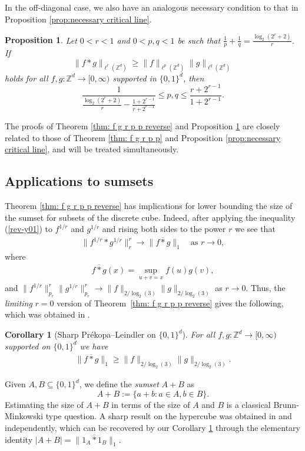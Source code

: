 \documentclass[reqno, 10pt]{amsart}
\theoremstyle{plain}
\numberwithin{equation}{section}
\newtheorem{corollary}[theorem]{Corollary}
\newtheorem{proposition}[theorem]{Proposition}
\theoremstyle{definition}
\newtheorem*{induction hypothesis}{Induction hypothesis}
\theoremstyle{remark}
\newcommand{\Z}{\mathbb{Z}}
\begin{document}
In the off-diagonal case, we also have an analogous necessary condition to that in Proposition \ref{prop:necessary critical line}.

\begin{proposition}\label{prop:necessary critical line r<1}
    Let $0<r < 1$ and $0 < p,q < 1$ be such that $\frac{1}{p}+\frac{1}{q}=\frac{\log_{2}(2^r+2)}{r}$. If
    \begin{equation*}%
        \|f \ast g\|_{\ell^{r}(\Z^d)} \geq \| f \|_{\ell^p(\Z^d)} \|g\|_{\ell^q(\Z^d)}
    \end{equation*}
    holds for all $f,g:\Z^d\to [0,\infty)$ supported in $\{0,1\}^d$, then 
    $$\frac{1}{\frac{\log_2 (2^r+2)}{r}-\frac{1+2^{r-1}}{r+2^{r-1}}} \leq p,q\leq \frac{r+2^{r-1}}{1+2^{r-1}}. $$
\end{proposition}

The proofs of Theorem \ref{thm: f g r p p reverse} and Proposition \ref{prop:necessary critical line r<1} are closely related to those of Theorem \ref{thm: f g r p p} and Proposition \ref{prop:necessary critical line}, and will be treated simultaneously.


\subsection{Applications to sumsets} 



Theorem \ref{thm: f g r p p reverse} has implications for lower bounding the size of the sumset for subsets of the discrete cube. Indeed, after applying the inequality (\ref{rev-y01}) to $f^{1/r}$ and $g^{1/r}$ and rising both sides to the power $r$ we see that 
\begin{align*}
    \| f^{1/r}*g^{1/r}\|_{r}^{r} \to \|f\overline{*}g\|_{1} \quad \text{as $r \to 0$},
\end{align*}
where 
\begin{align*}
    f\overline{*}g(x) =\sup_{u+v=x}f(u)g(v),
\end{align*}
and $\|f^{1/r}\|_{p_{r}}^{r} \|g^{1/r}\|_{p_{r}}^{r} \to \|f\|_{2/\log_{2}(3)} \|g\|_{2/\log_{2}(3)}$ as $r \to 0$. Thus, the {\em limiting} $r=0$ version of Theorem~\ref{thm: f g r p p reverse}  gives the following, which was obtained in \cite{BKIM}.
\begin{corollary}[Sharp Pr\'ekopa--Leindler on $\{0,1\}^{d}$]\label{cor011}
For all $f, g :\mathbb{Z}^{d} \to [0, \infty)$ supported on $\{0,1\}^{d}$ we have 
\begin{align*}
    \| f \overline{*} g\|_{1}\geq \|f\|_{2/\log_{2}(3)} \|g\|_{2/\log_{2}(3)}.
\end{align*}
\end{corollary}
Given $A, B \subseteq \{0,1\}^d$, we define the \textit{sumset} $A+B$ as
\begin{equation*}
    A + B := \{a + b : a \in A, b \in B\}.
\end{equation*}
Estimating the size of $A+B$ in terms of the size of $A$ and $B$ is a classical Brunn-Minkowski type question. A sharp result on the hypercube was obtained in \cite{Woodall} and \cite{HS} independently, which can be recovered by our Corollary \ref{cor011} through the elementary identity $|A+B|=\| 1_{A} \overline{*} 1_{B}\|_{1}$. 
\end{document}

